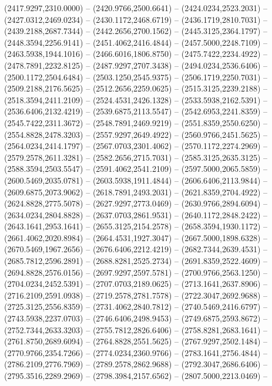 \begin{scope}[y=0.80pt, x=0.80pt, yscale=-1.000000, xscale=1.000000, inner sep=0pt, outer sep=0pt]
    (2417.9297,2310.0000) -- (2420.9766,2500.6641) -- (2424.0234,2523.2031) --
    (2427.0312,2469.0234) -- (2430.1172,2468.6719) -- (2436.1719,2810.7031) --
    (2439.2188,2687.7344) -- (2442.2656,2700.1562) -- (2445.3125,2364.1797) --
    (2448.3594,2256.9141) -- (2451.4062,2416.4844) -- (2457.5000,2248.7109) --
    (2463.5938,1944.1016) -- (2466.6016,1806.8750) -- (2475.7422,2234.4922) --
    (2478.7891,2232.8125) -- (2487.9297,2707.3438) -- (2494.0234,2536.6406) --
    (2500.1172,2504.6484) -- (2503.1250,2545.9375) -- (2506.1719,2250.7031) --
    (2509.2188,2176.5625) -- (2512.2656,2259.0625) -- (2515.3125,2239.2188) --
    (2518.3594,2411.2109) -- (2524.4531,2426.1328) -- (2533.5938,2162.5391) --
    (2536.6406,2132.4219) -- (2539.6875,2113.5547) -- (2542.6953,2241.8359) --
    (2545.7422,2311.3672) -- (2548.7891,2469.9219) -- (2551.8359,2550.6250) --
    (2554.8828,2478.3203) -- (2557.9297,2649.4922) -- (2560.9766,2451.5625) --
    (2564.0234,2414.1797) -- (2567.0703,2301.4062) -- (2570.1172,2274.2969) --
    (2579.2578,2611.3281) -- (2582.2656,2715.7031) -- (2585.3125,2635.3125) --
    (2588.3594,2503.5547) -- (2591.4062,2541.2109) -- (2597.5000,2065.5859) --
    (2600.5469,2035.0781) -- (2603.5938,1911.4844) -- (2606.6406,2113.9844) --
    (2609.6875,2073.9062) -- (2618.7891,2493.2031) -- (2621.8359,2704.4922) --
    (2624.8828,2775.5078) -- (2627.9297,2773.0469) -- (2630.9766,2894.6094) --
    (2634.0234,2804.8828) -- (2637.0703,2861.9531) -- (2640.1172,2848.2422) --
    (2643.1641,2953.1641) -- (2655.3125,2154.2578) -- (2658.3594,1930.1172) --
    (2661.4062,2020.8984) -- (2664.4531,1927.3047) -- (2667.5000,1898.6328) --
    (2670.5469,1967.2656) -- (2676.6406,2212.4219) -- (2682.7344,2639.4531) --
    (2685.7812,2596.2891) -- (2688.8281,2525.2734) -- (2691.8359,2522.4609) --
    (2694.8828,2576.0156) -- (2697.9297,2597.5781) -- (2700.9766,2563.1250) --
    (2704.0234,2452.5391) -- (2707.0703,2189.0625) -- (2713.1641,2637.8906) --
    (2716.2109,2591.0938) -- (2719.2578,2781.7578) -- (2722.3047,2692.9688) --
    (2725.3125,2556.8359) -- (2731.4062,2840.7812) -- (2740.5469,2416.6797) --
    (2743.5938,2237.0703) -- (2746.6406,2498.9453) -- (2749.6875,2593.8672) --
    (2752.7344,2633.3203) -- (2755.7812,2826.6406) -- (2758.8281,2683.1641) --
    (2761.8750,2689.6094) -- (2764.8828,2551.5625) -- (2767.9297,2502.1484) --
    (2770.9766,2354.7266) -- (2774.0234,2360.9766) -- (2783.1641,2756.4844) --
    (2786.2109,2776.7969) -- (2789.2578,2862.9688) -- (2792.3047,2686.6406) --
    (2795.3516,2289.2969) -- (2798.3984,2157.6562) -- (2807.5000,2213.0469) --

\end{scope}
